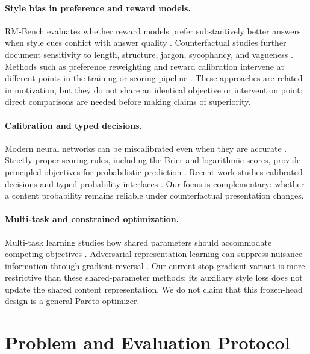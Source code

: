 \documentclass[letterpaper]{article} %
\begin{document}
\paragraph{Style bias in preference and reward models.}
RM-Bench evaluates whether reward models prefer substantively better answers when style cues conflict with answer quality \citep{liu2025rmbench}. Counterfactual studies further document sensitivity to length, structure, jargon, sycophancy, and vagueness \citep{bharadwaj2026flattery}. Methods such as preference reweighting and reward calibration intervene at different points in the training or scoring pipeline \citep{wang2026patterning,zhu2025charm,leng2025overconf}. These approaches are related in motivation, but they do not share an identical objective or intervention point; direct comparisons are needed before making claims of superiority.

\paragraph{Calibration and typed decisions.}
Modern neural networks can be miscalibrated even when they are accurate \citep{guo2017calibration}. Strictly proper scoring rules, including the Brier and logarithmic scores, provide principled objectives for probabilistic prediction \citep{brier1950verification,gneiting2007scoring}. Recent work studies calibrated decisions and typed probability interfaces \citep{justaskjev2026,openjev2026prdo,deusser2026jevbench,typesafe2026jev}. Our focus is complementary: whether a content probability remains reliable under counterfactual presentation changes.

\paragraph{Multi-task and constrained optimization.}
Multi-task learning studies how shared parameters should accommodate competing objectives \citep{sener2018multi,yu2020gradient}. Adversarial representation learning can suppress nuisance information through gradient reversal \citep{ganin2015unsupervised}. Our current stop-gradient variant is more restrictive than these shared-parameter methods: its auxiliary style loss does not update the shared content representation. We do not claim that this frozen-head design is a general Pareto optimizer.

\section{Problem and Evaluation Protocol}
\end{document}
